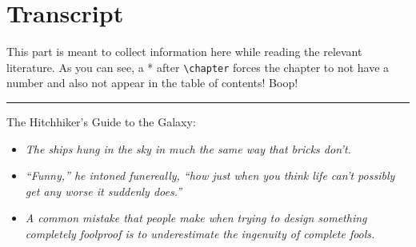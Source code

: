 \documentclass[../bachelor_paper.tex]{subfiles}
\begin{document}
\chapter{Transcript}
    This part is meant to collect information here while reading the relevant literature.
    As you can see, a * after \texttt{\textbackslash{}chapter} forces the chapter to not have a number and also not appear in the table of contents! Boop!
    
    
    
    \bigskip\hrule
    
    The Hitchhiker's Guide to the Galaxy:
    \begin{itemize}
        \item \textit{The ships hung in the sky in much the same way that bricks don't.}
        \item \textit{``Funny,'' he intoned funereally, ``how just when you think life can’t possibly get any worse it suddenly does.''}
        \item \textit{A common mistake that people make when trying to design something completely foolproof is to underestimate the ingenuity of complete fools.}
    \end{itemize}
\end{document}
